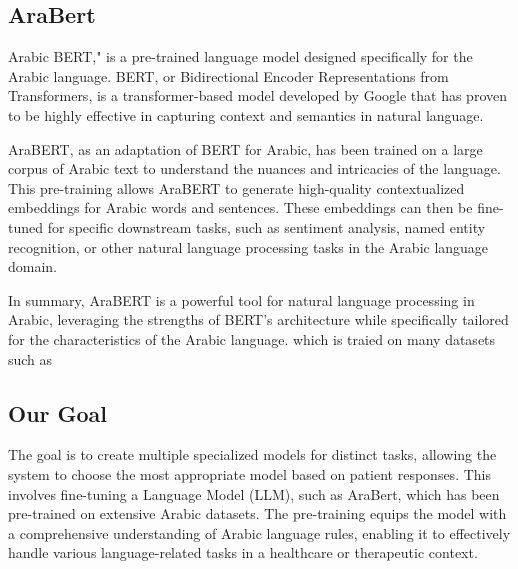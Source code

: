 \subsection{AraBert}
\cite{Arabert}
Arabic BERT," is a pre-trained language model designed specifically for the Arabic language. BERT, or Bidirectional Encoder Representations from Transformers, is a transformer-based model developed by Google that has proven to be highly effective in capturing context and semantics in natural language.

AraBERT, as an adaptation of BERT for Arabic, has been trained on a large corpus of Arabic text to understand the nuances and intricacies of the language. This pre-training allows AraBERT to generate high-quality contextualized embeddings for Arabic words and sentences. These embeddings can then be fine-tuned for specific downstream tasks, such as sentiment analysis, named entity recognition, or other natural language processing tasks in the Arabic language domain.

In summary, AraBERT is a powerful tool for natural language processing in Arabic, leveraging the strengths of BERT's architecture while specifically tailored for the characteristics of the Arabic language.
which is traied on many datasets such as 
\subsection{Our Goal}
The goal is to create multiple specialized models for distinct tasks,
allowing the system to choose the most appropriate model based on patient responses.
This involves fine-tuning a Language Model (LLM),
such as AraBert, which has been pre-trained on extensive Arabic datasets.
The pre-training equips the model with a comprehensive understanding of Arabic language rules,
enabling it to effectively handle various language-related tasks in a healthcare or therapeutic context.


